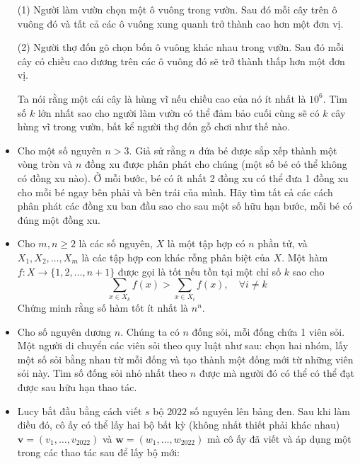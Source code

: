 \documentclass[11pt]{scrartcl}
\begin{document}
\begin{itemize}[label=, leftmargin=0em, itemsep=-0em]
\begin{btvn}
        (1) Người làm vườn chọn một ô vuông trong vườn. Sau đó mỗi cây trên ô vuông đó và tất cả các ô vuông xung quanh trở thành cao hơn một đơn vị.
        
        (2) Người thợ đốn gõ chọn bốn ô vuông khác nhau trong vườn. Sau đó mỗi cây có chiều cao dương trên các ô vuông đó sẽ trở thành thấp hơn một đơn vị.
        
        Ta nói rằng một cái cây là hùng vĩ nếu chiều cao của nó ít nhất là $10^6$. Tìm số $k$ lớn nhất sao cho người làm vườn có thể đảm bảo cuối cùng sẽ có $k$ cây hùng vĩ trong vườn, bất kể người thợ đốn gỗ chơi như thế nào.
    \end{btvn}
    
    \item\begin{btvn} Cho một số nguyên $n > 3$. Giả sử rằng $n$ đứa bé được sắp xếp thành một vòng tròn và $n$ đồng xu được phân phát cho chúng (một số bé có thể không có đồng xu nào). Ở mỗi bước, bé có ít nhất 2 đồng xu có thể đưa 1 đồng xu cho mỗi bé ngay bên phải và bên trái của mình. Hãy tìm tất cả các cách phân phát các đồng xu ban đầu sao cho sau một số hữu hạn bước, mỗi bé có đúng một đồng xu.
    \end{btvn}

    \item \begin{btvn} Cho $m,n \geqslant 2$ là các số nguyên, $X$ là một tập hợp có $n$ phần tử, và$ X_1, X_2, \ldots, X_m$ là các tập hợp con khác rỗng phân biệt của $X$. Một hàm $f \colon X \to \{1,2,\ldots,n+1\}$ được gọi là tốt nếu tồn tại một chỉ số $k$ sao cho 
        \[\displaystyle\sum_{x \in X_k} f(x )>\sum_{x \in X_i} f(x), \quad \forall i \ne k\]
    Chứng minh rằng số hàm tốt ít nhất là $n^n$.
    \end{btvn}

    \item \begin{btvn}
        Cho số nguyên dương $n$. Chúng ta có $n$ đống sỏi, mỗi đống chứa 1 viên sỏi. Một người di chuyển các viên sỏi theo quy luật như sau: chọn hai nhóm, lấy một số sỏi bằng nhau từ mỗi đống và tạo thành một đống mới từ những viên sỏi này. Tìm số đống sỏi nhỏ nhất theo $n$ được mà người đó có thể có thể đạt được sau hữu hạn thao tác.
    \end{btvn}

    \item \begin{btvn}
        Lucy bắt đầu bằng cách viết $s$ bộ $2022$ số nguyên lên bảng đen. Sau khi làm điều đó, cô ấy có thể lấy hai bộ bất kỳ (không nhất thiết phải khác nhau) $\mathbf{v}=(v_1,\ldots,v_{2022})$ và $\mathbf{w}=(w_1,\ldots,w_{ 2022})$ mà cô ấy đã viết và áp dụng một trong các thao tác sau để lấy bộ mới:


\end{btvn}
\end{itemize}
\end{document}
